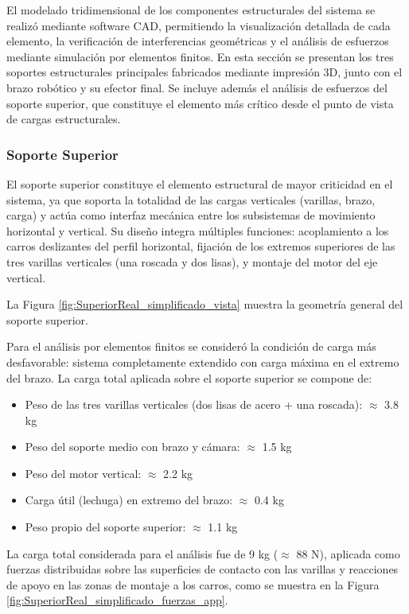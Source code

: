 El modelado tridimensional de los componentes estructurales del sistema se realizó mediante software CAD, permitiendo la visualización detallada de cada elemento, la verificación de interferencias geométricas y el análisis de esfuerzos mediante simulación por elementos finitos. En esta sección se presentan los tres soportes estructurales principales fabricados mediante impresión 3D, junto con el brazo robótico y su efector final. Se incluye además el análisis de esfuerzos del soporte superior, que constituye el elemento más crítico desde el punto de vista de cargas estructurales.

\subsubsection{Soporte Superior}

El soporte superior constituye el elemento estructural de mayor criticidad en el sistema, ya que soporta la totalidad de las cargas verticales (varillas, brazo, carga) y actúa como interfaz mecánica entre los subsistemas de movimiento horizontal y vertical. Su diseño integra múltiples funciones: acoplamiento a los carros deslizantes del perfil horizontal, fijación de los extremos superiores de las tres varillas verticales (una roscada y dos lisas), y montaje del motor del eje vertical.

La Figura \ref{fig:SuperiorReal_simplificado_vista} muestra la geometría general del soporte superior.

Para el análisis por elementos finitos se consideró la condición de carga más desfavorable: sistema completamente extendido con carga máxima en el extremo del brazo. La carga total aplicada sobre el soporte superior se compone de:

\begin{itemize}[label=$\bullet$]
    \item Peso de las tres varillas verticales (dos lisas de acero + una roscada): $\approx$ 3.8 kg
    \item Peso del soporte medio con brazo y cámara: $\approx$ 1.5 kg
    \item Peso del motor vertical: $\approx$ 2.2 kg
    \item Carga útil (lechuga) en extremo del brazo: $\approx$ 0.4 kg
    \item Peso propio del soporte superior: $\approx$ 1.1 kg
\end{itemize}

La carga total considerada para el análisis fue de 9 kg ($\approx$ 88 N), aplicada como fuerzas distribuidas sobre las superficies de contacto con las varillas y reacciones de apoyo en las zonas de montaje a los carros, como se muestra en la Figura \ref{fig:SuperiorReal_simplificado_fuerzas_app}.


